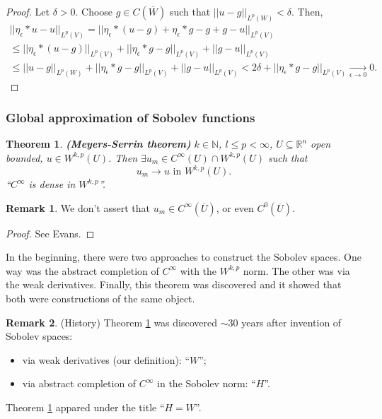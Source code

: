 \documentclass[12pt]{article}
\newtheorem{theorem}{Theorem}[section]
\theoremstyle{definition}
\newtheorem*{remark}{Remark}
\begin{document}
\begin{proof}
Let $\delta>0$. Choose $g\in C(\overline W)$ such that $||u-g||_{L^p(W)}<\delta$. Then,
\begin{multline*}
||\eta_\epsilon*u-u||_{L^p(V)}=\big|\big|\eta_\epsilon*(u-g)+\eta_\epsilon*g-g+g-u\big|\big|_{L^p(V)}\\
\leq\big|\big|\eta_\epsilon*(u-g)\big|\big|_{L^p(V)}+||\eta_\epsilon*g-g||_{L^p(V)}+||g-u||_{L^p(V)}\\
\leq||u-g||_{L^p(W)}+||\eta_\epsilon*g-g||_{L^p(V)}+||g-u||_{L^p(V)}<2\delta+||\eta_\epsilon*g-g||_{L^p(V)}\xrightarrow[\epsilon\to0]{}0.
\end{multline*}
\end{proof}

\subsubsection{Global approximation of Sobolev functions}
\begin{theorem}\label{Meyers_Serrin}
\emph{\textbf{(Meyers-Serrin theorem)}} $k\in\mathbb N$, $l\leq p<\infty$, $U\subseteq\mathbb R^n$ open bounded, $u\in W^{k,p}(U)$. Then $\exists u_m\in C^\infty(U)\cap W^{k,p}(U)$ such that
\[u_m\longrightarrow u\text{ in }W^{k,p}(U).\]
``$C^\infty$ is dense in $W^{k,p}$''.
\end{theorem}

\begin{remark}
We don't assert that $u_m\in C^\infty(\overline U)$, or even $C^0(\overline U)$.
\end{remark}

\begin{proof}
See Evans.
\end{proof}

In the beginning, there were two approaches to construct the Sobolev spaces. One way was the abstract completion of $C^\infty$ with the $W^{k,p}$ norm. The other was via the weak derivatives. Finally, this theorem was discovered and it showed that both were constructions of the same object.

\begin{remark}
(History) Theorem \ref{Meyers_Serrin} was discovered $\sim30$ years after invention of Sobolev spaces:
\begin{itemize}
\item via weak derivatives (our definition): ``$W$'';
\item via abstract completion of $C^\infty$ in the Sobolev norm: ``$H$''.
\end{itemize}
Theorem \ref{Meyers_Serrin} appared under the title ``$H=W$''.
\end{remark}
\end{document}
